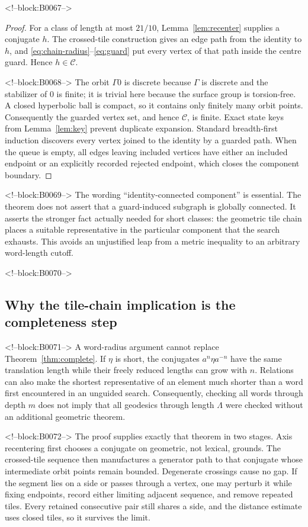 \documentclass[11pt,a4paper]{article}
\theoremstyle{definition}
\begin{document}
<!--block:B0067-->
\begin{proof}
For a class of length at most \(21/10\), Lemma~\ref{lem:recenter} supplies a
conjugate \(h\).  The crossed-tile construction gives an edge path from the
identity to \(h\), and \eqref{eq:chain-radius}--\eqref{eq:guard} put every
vertex of that path inside the centre guard.  Hence \(h\in\mathcal C\).

<!--block:B0068-->
The orbit \(\Gamma0\) is discrete because \(\Gamma\) is discrete and the
stabilizer of \(0\) is finite; it is trivial here because the surface group is
torsion-free.  A closed hyperbolic ball is compact, so it contains only
finitely many orbit points.  Consequently the guarded vertex set, and hence
\(\mathcal C\), is finite.  Exact state keys from Lemma~\ref{lem:key} prevent
duplicate expansion.  Standard breadth-first induction discovers every
vertex joined to the identity by a guarded path.  When the queue is empty,
all edges leaving included vertices have either an included endpoint or an
explicitly recorded rejected endpoint, which closes the component boundary.
\end{proof}

<!--block:B0069-->
The wording ``identity-connected component'' is essential.  The theorem does
not assert that a guard-induced subgraph is globally connected.  It asserts
the stronger fact actually needed for short classes: the geometric tile
chain places a suitable representative in the particular component that the
search exhausts.  This avoids an unjustified leap from a metric inequality to
an arbitrary word-length cutoff.

<!--block:B0070-->
\subsection{Why the tile-chain implication is the completeness step}

<!--block:B0071-->
A word-radius argument cannot replace Theorem~\ref{thm:complete}.  If
\(\eta\) is short, the conjugates \(a^n\eta a^{-n}\) have the same translation
length while their freely reduced lengths can grow with \(n\).  Relations can
also make the shortest representative of an element much shorter than a word
first encountered in an unguided search.  Consequently, checking all words
through depth \(m\) does not imply that all geodesics through length
\(\Lambda\) were checked without an additional geometric theorem.

<!--block:B0072-->
The proof supplies exactly that theorem in two stages.  Axis recentering first
chooses a conjugate on geometric, not lexical, grounds.  The crossed-tile
sequence then manufactures a generator path to that conjugate whose
intermediate orbit points remain bounded.  Degenerate crossings cause no
gap.  If the segment lies on a side or passes through a vertex, one may
perturb it while fixing endpoints, record either limiting adjacent sequence,
and remove repeated tiles.  Every retained consecutive pair still shares a
side, and the distance estimate uses closed tiles, so it survives the limit.
\end{document}

